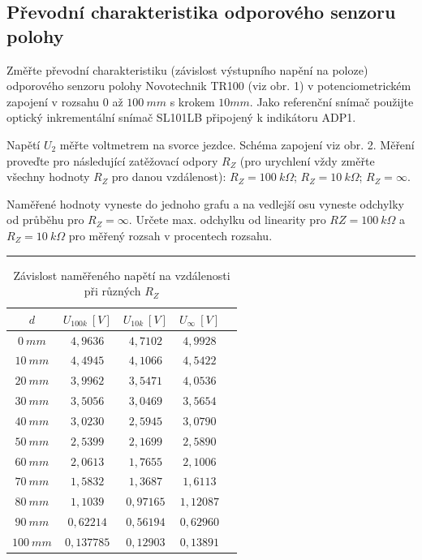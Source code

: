 \documentclass[a4paper,12pt]{article}
\begin{document}
\subsection{Převodní charakteristika odporového senzoru polohy}

Změřte převodní charakteristiku (závislost výstupního napění na poloze) odporového senzoru polohy
Novotechnik TR100 (viz obr. 1) v potenciometrickém zapojení v rozsahu $0$ až $100\ mm$ s krokem $10 mm$.
Jako referenční snímač použijte optický inkrementální snímač SL101LB připojený k indikátoru ADP1.

Napětí $U_2$ měřte voltmetrem na svorce jezdce. Schéma zapojení viz obr. 2. Měření proveďte pro
následující zatěžovací odpory $R_Z$ (pro urychlení vždy změřte všechny hodnoty $R_Z$ pro danou
vzdálenost): $R_Z = 100\ k\Omega$; $R_Z = 10\ k\Omega$; $R_Z = \infty$.

Naměřené hodnoty vyneste do jednoho grafu a na vedlejší osu vyneste odchylky od průběhu pro $R_Z = \infty$. Určete max. odchylku od linearity pro $RZ = 100\ k\Omega$ a $R_Z = 10\ k\Omega$ pro měřený rozsah v procentech rozsahu.

\par\noindent\rule{\textwidth}{0.4pt}

\begin{table}[H]
\centering
\begin{tabular}{|c|c|c|c|c|}
\hline
$d$ & $U_{100k}\ [V]$ & $U_{10k}\ [V]$ & $U_{\infty}\ [V]$ \\
\hline
$0\ mm$ & $4,9636$ & $4,7102$ & $4,9928$\\
\hline
$10\ mm$ & $4,4945$ & $4,1066$ & $4,5422$\\
\hline
$20\ mm$ & $3,9962$ & $3,5471$ & $4,0536$\\
\hline
$30\ mm$ & $3,5056$ & $3,0469$ & $3,5654$\\
\hline
$40\ mm$ & $3,0230$ & $2,5945$ & $3,0790$\\
\hline
$50\ mm$ & $2,5399$ & $2,1699$ & $2,5890$\\
\hline
$60\ mm$ & $2,0613$ & $1,7655$ & $2,1006$\\
\hline
$70\ mm$ & $1,5832$ & $1,3687$ & $1,6113$\\
\hline
$80\ mm$ & $1,1039$ & $0,97165$ & $1,12087$\\
\hline
$90\ mm$ & $0,62214$ & $0,56194$ & $0,62960$\\
\hline
$100\ mm$ & $0,137785$ & $0,12903$ & $0,13891$\\
\hline
\end{tabular}
\caption{Závislost naměřeného napětí na vzdálenosti při různých $R_Z$}
\end{table}
\end{document}
